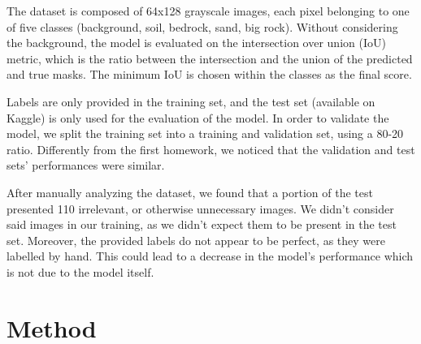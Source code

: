 \documentclass[11pt]{article}
\begin{document}
\begin{multicols}{2}

      The dataset is composed of 64x128 grayscale images, each pixel belonging to one of five classes (background, soil, bedrock, sand, big rock). Without considering the background, the model is evaluated on the intersection over union (IoU) metric, which is the ratio between the intersection and the union of the predicted and true masks. The minimum IoU is chosen within the classes as the final score.

      Labels are only provided in the training set, and the test set (available on Kaggle) is only used for the evaluation of the model. In order to validate the model, we split the training set into a training and validation set, using a 80-20 ratio. Differently from the first homework, we noticed that the validation and test sets' performances were similar.

      After manually analyzing the dataset, we found that a portion of the test presented 110 irrelevant, or otherwise unnecessary images. We didn't consider said images in our training, as we didn't expect them to be present in the test set. Moreover, the provided labels do not appear to be perfect, as they were labelled by hand. This could lead to a decrease in the model's performance which is not due to the model itself.

      \section{Method}



\end{multicols}
\end{document}
